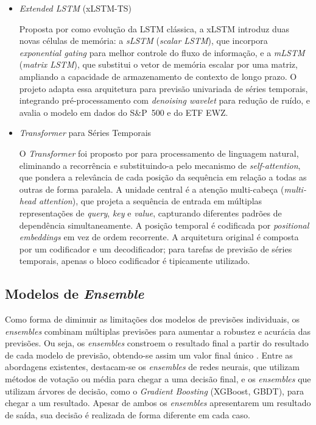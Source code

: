 \begin{itemize}
    \item \textit{Extended LSTM} (xLSTM-TS)

    Proposta por  como evolução da LSTM clássica, a xLSTM introduz duas novas células de memória: a \textit{sLSTM} (\textit{scalar LSTM}), que incorpora \textit{exponential gating} para melhor controle do fluxo de informação, e a \textit{mLSTM} (\textit{matrix LSTM}), que substitui o vetor de memória escalar por uma matriz, ampliando a capacidade de armazenamento de contexto de longo prazo. O projeto adapta essa arquitetura para previsão univariada de séries temporais, integrando pré-processamento com \textit{denoising wavelet} para redução de ruído, e avalia o modelo em dados do S\&P~500 e do ETF EWZ.

    \item \textit{Transformer} para Séries Temporais

    O \textit{Transformer} foi proposto por  para processamento de linguagem natural, eliminando a recorrência e substituindo-a pelo mecanismo de \textit{self-attention}, que pondera a relevância de cada posição da sequência em relação a todas as outras de forma paralela. A unidade central é a atenção multi-cabeça (\textit{multi-head attention}), que projeta a sequência de entrada em múltiplas representações de \textit{query}, \textit{key} e \textit{value}, capturando diferentes padrões de dependência simultaneamente. A posição temporal é codificada por \textit{positional embeddings} em vez de ordem recorrente. A arquitetura original é composta por um codificador e um decodificador; para tarefas de previsão de séries temporais, apenas o bloco codificador é tipicamente utilizado.

\end{itemize}

\subsection{Modelos de \textit{Ensemble}}

Como forma de diminuir as limitações dos modelos de previsões individuais, os \textit{ensembles} combinam múltiplas previsões para aumentar a robustez e acurácia das previsões. Ou seja, os \textit{ensembles} constroem o resultado final a partir do resultado de cada modelo de previsão, obtendo-se assim um valor final único \cite{site5}. Entre as abordagens existentes, destacam-se os \textit{ensembles} de redes neurais, que utilizam métodos de votação ou média para chegar a uma decisão final, e os \textit{ensembles} que utilizam árvores de decisão, como o \textit{Gradient Boosting} (XGBoost, GBDT), para chegar a um resultado. Apesar de ambos os \textit{ensembles} apresentarem um resultado de saída, sua decisão é realizada de forma diferente em cada caso.


